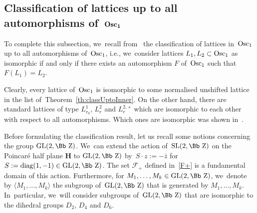 \documentclass[pdftex]{sigma}
\newcommand\ZZ{{\mbox{\Bb Z}}}
\newcommand\cF{{\mathcal F}}
\newcommand{\GL}{\mathop{{\rm GL}}}
\newcommand{\SL}{\mathop{{\rm SL}}}
\newcommand{\Osc}{{\rm Osc}}
\newcommand{\diag}{\mathop{{\rm diag}}}
\newcommand\la{\langle}
\newcommand\ra{\rangle}
\numberwithin{equation}{section}
\begin{document}
\subsection[Classification of lattices up to all automorphisms of~$\Osc_1$]
{Classification of lattices up to all automorphisms of~$\boldsymbol{\Osc_1}$}

To complete this subsection, we~recall from~\cite{F} the classification of lattices in~$\Osc_1$ up to all automorphisms of~$\Osc_1$, i.e., we~consider lattices $L_1,L_2\subset \Osc_1$ as isomorphic if and only if there exists an automorphism $F$ of~$\Osc_1$ such that $F(L_1)=L_2$.

Clearly, every lattice of~$\Osc_1$ is isomorphic to some normalised unshifted lattice in the list of~Theorem~\ref{th:classUptoInner}. On the other hand, there are standard lattices of type $L^1_{r_0}$, $L^2_r$ and $L^{2,+}_r$ which are isomorphic to each other with respect to all automorphisms. Which ones are isomorphic was shown in~\cite{F}.

Before formulating the classification result, let us recall some notions concerning the group $\GL(2,\ZZ)$. We~can extend the action of~$\SL(2,\ZZ)$ on the Poincar\'e half plane $\textbf{H}$ to $\GL(2,\ZZ)$ by~$S\cdot z:=-\bar z$ for $S:=\diag(1,-1)\in\GL(2,\ZZ)$. The set
 $\cF_+$ defined in~\eqref{F+}
 is a fundamental domain of this action. Furthermore, for $M_1,\dots,M_k\in\GL(2,\ZZ)$, we~denote by $\la M_1,\dots,M_k \ra$ the subgroup of~$\GL(2,\ZZ)$ that is generated by $M_1,\dots,M_k$. In~particular, we~will consider subgroups of~$\GL(2,\ZZ)$ that are isomorphic to the dihedral groups $D_2$, $D_4$ and $D_6$.
\end{document}
